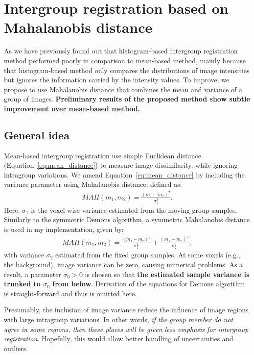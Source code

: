 \documentclass[preprint,review,12pt]{elsarticle}
\newcommand{\eg}{{e.g., }}
\begin{document}
\section{Intergroup registration based on Mahalanobis distance}
\label{sec:mahalanobis}
As we have previously found out that histogram-based intergroup registration method performed poorly in comparison to mean-based method, mainly because that histogram-based method only compares the distributions of image intensities but ignores the information carried by the intensity values. To improve, we propose to use Mahalanobis distance that combines the mean and variance of a group of images. {\bf Preliminary results of the proposed method show subtle improvement over mean-based method.}

\subsection{General idea}
Mean-based intergroup registration use simple Euclidean distance (Equation~\ref{eq:mean_distance}) to measure image dissimilarity, while ignoring intragroup variations. We amend Equation~\ref{eq:mean_distance} by including the variance parameter using Mahalanobis distance, defined as:
\begin{align}
MAH(m_1,m_2)=\frac{(m_1-m_2)^2}{\sigma^2_1}.
\end{align}
Here, $\sigma_1$ is the voxel-wise variance estimated from the moving group samples. Similarly to the symmetric Demons algorithm, a symmetric Mahalanobis distance is used in my implementation, given by:
\begin{align}
MAH(m_1,m_2)=\frac{(m_1-m_2)^2}{\sigma^2_1}+\frac{(m_1-m_2)^2}{\sigma^2_2},
\label{eq:symmetric_mahalanobis}
\end{align}
with variance $\sigma_2$ estimated from the fixed group samples. At some voxels (\eg the background), image variance can be zero, causing numerical problems. As a result, a parameter $\sigma_0>0$ is chosen so that {\bf  the estimated sample variance is trunked to $\sigma_0$ from below}. Derivation of the equations for Demons algorithm is straight-forward and thus is omitted here.

Presumably, the inclusion of image variance reduce the influence of image regions with large intragroup variations. In other words, {\it if the group member do not agree in some regions, then these places will be given less emphasis for intergroup registration}. Hopefully, this would allow better handling of uncertainties and outliers.
\end{document}
